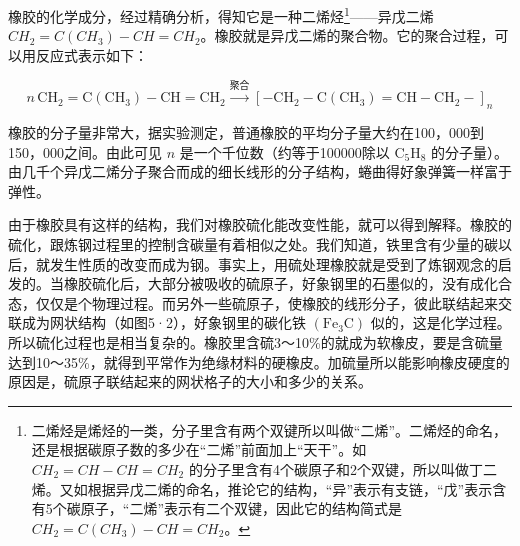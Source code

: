 橡胶的化学成分，经过精确分析，得知它是一种二烯烃\footnote{二烯烃是烯烃的一类，分子里含有两个双键所以叫做``二烯''。二烯烃的命名，还是根据碳原子数的多少在``二烯''前面加上``天干''。如
  \(CH_{2}=CH-CH=CH_{2}\)
  的分子里含有4个碳原子和2个双键，所以叫做丁二烯。又如根据异戊二烯的命名，推论它的结构，``异''表示有支链，``戊''表示含有5个碳原子，``二烯''表示有二个双键，因此它的结构简式是
  \(CH_{2}=C(CH_{3})-CH=CH_{2}\)。}------异戊二烯
\(CH_{2}=C(CH_{3})-CH=CH_{2}\)。橡胶就是异戊二烯的聚合物。它的聚合过程，可以用反应式表示如下：

\[
n\,\mathrm{CH}_{2}=\mathrm{C}(\mathrm{CH}_{3})-\mathrm{CH}=\mathrm{CH}_{2}\xrightarrow{\text{聚合}}[-\mathrm{CH}_{2}-\mathrm{C}(\mathrm{CH}_{3})=\mathrm{CH}-\mathrm{CH}_{2}-]_{n}
\]

橡胶的分子量非常大，据实验测定，普通橡胶的平均分子量大约在100，000到150，000之间。由此可见
\(n\) 是一个千位数（约等于100000除以 \(\mathrm{C}_{5}\mathrm{H}_{8}\)
的分子量）。由几千个异戊二烯分子聚合而成的细长线形的分子结构，蜷曲得好象弹簧一样富于弹性。

由于橡胶具有这样的结构，我们对橡胶硫化能改变性能，就可以得到解释。橡胶的硫化，跟炼钢过程里的控制含碳量有着相似之处。我们知道，铁里含有少量的碳以后，就发生性质的改变而成为钢。事实上，用硫处理橡胶就是受到了炼钢观念的启发的。当橡胶硫化后，大部分被吸收的硫原子，好象钢里的石墨似的，没有成化合态，仅仅是个物理过程。而另外一些硫原子，使橡胶的线形分子，彼此联结起来交联成为网状结构（如图5·2），好象钢里的碳化铁
\(\left(\mathrm{Fe}_{3}\mathrm{C}\right)\)
似的，这是化学过程。所以硫化过程也是相当复杂的。橡胶里含硫3～10\%的就成为软橡皮，要是含硫量达到10～35\%，就得到平常作为绝缘材料的硬橡皮。加硫量所以能影响橡皮硬度的原因是，硫原子联结起来的网状格子的大小和多少的关系。

